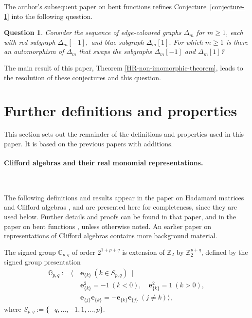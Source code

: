 \documentclass[12pt,a4paper]{article}
\newcommand{\mb}[1]{\mathbb{#1}}
\newcommand{\mf}[1]{\mathbf{#1}}
\newcommand{\G}{\mb{G}}
\newcommand{\Z}{\mb{Z}}
\newcommand{\Rep}{P}
\newtheorem{Question}{Question}
\begin{document}
The author's subsequent paper on bent functions \cite{Leo15Twin} 
refines Conjecture~\ref{conjecture-1} into the following question.
\begin{Question}
\label{Question-1}
Consider the sequence of edge-coloured graphs $\varDelta_m$ for $m \geqslant 1$,
each with red subgraph $\varDelta_m[-1],$ and blue subgraph $\varDelta_m[1].$
For which $m \geqslant 1$ is there an automorphism of $\varDelta_m$ 
that swaps the subgraphs $\varDelta_m[-1]$ and $\varDelta_m[1]$?
\end{Question}

The main result of this paper, Theorem \ref{HR-non-imomorphic-theorem}, 
leads to the resolution of these conjectures and this question.

\section{Further definitions and properties}
\label{sec-Preliminaries}
This section sets out the remainder of the definitions and properties used in this paper.
It is based on the previous papers \cite{Leo14Constructions, Leo15Twin} with additions.

\paragraph*{Clifford algebras and their real monomial representations.}
\label{sec-Clifford}

~

The following definitions and results appear in the paper on Hada\-mard matrices and Clifford algebras \cite{Leo14Constructions},
and are presented here for completeness, since they are used below. 
Further details and proofs can be found in that paper, and in the paper on bent functions \cite{Leo15Twin},
unless otherwise noted.
An earlier paper on representations of Clifford algebras \cite{Leo05} contains more background material.

The signed group \cite{Cra95}
$\G_{p,q}$ of order $2^{1+p+q}$ 
is extension of $\Z_2$ by $\Z_2^{p+q}$,
defined by the signed group presentation
%
\begin{align*}
\G_{p,q} := \bigg\langle \ 
&\mf{e}_{\{k\}}\ (k \in S_{p,q})\ \mid
\\
&\mf{e}_{\{k\}}^2 = -1\ (k < 0), \quad \mf{e}_{\{k\}}^2 = 1\ (k > 0),
\\
&\mf{e}_{\{j\}}\mf{e}_{\{k\}} = -\mf{e}_{\{k\}}\mf{e}_{\{j\}}\ (j \neq k) \bigg\rangle,
\end{align*}
%
where $S_{p,q} := \{-q,\ldots,-1,1,\ldots,p\}.$
% 
\end{document}
